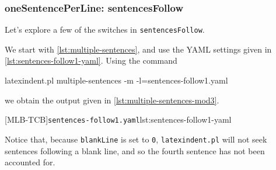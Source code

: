 \subsubsection{oneSentencePerLine: sentencesFollow}
 Let's explore a few of the switches in \texttt{sentencesFollow}.

 \begin{example}
 We start with \vref{lst:multiple-sentences}, and use the YAML settings given in
 \cref{lst:sentences-follow1-yaml}. Using the command 
  

 \begin{commandshell}
latexindent.pl multiple-sentences -m -l=sentences-follow1.yaml
\end{commandshell}

 we obtain the output given in \cref{lst:multiple-sentences-mod3}.

 \begin{cmhtcbraster}
  [MLB-TCB]{\texttt{sentences-follow1.yaml}}{lst:sentences-follow1-yaml}
 \end{cmhtcbraster}

 Notice that, because \texttt{blankLine} is set to \texttt{0}, \texttt{latexindent.pl}
 will not seek sentences following a blank line, and so the fourth sentence has not been
 accounted for.
 \end{example}


